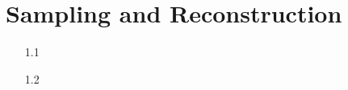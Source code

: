 \section{Sampling and Reconstruction}

\begin{itemize}
	\item[1.1] \blindtext{}
	\item[1.2] \blindtext{}
\end{itemize}
